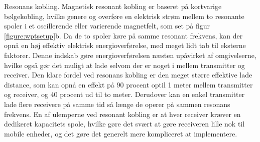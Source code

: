Resonans kobling. 
Magnetisk resonant kobling er baseret på kortvarige bølgekobling, hvilke genere og overføre en elektrisk strøm mellem to resonante spoler i et oscillerende eller varierende magnetfelt, som set på figur \ref{figure:wptsetup}b. Da de to spoler køre på samme resonant frekvens, kan der opnå en høj effektiv elektrisk energioverførelse, med meget lidt tab til  eksterne faktorer. Denne indskab gøre energioverførelsen næsten upåvirket af omgivelserne, hvilke også gør det muligt at lade selvom der er noget i mellem transmitter og receiver. 
Den klare fordel ved resonans kobling er den meget større effektive lade distance, som kan opnå en effekt på 90 procent optil 1 meter mellem transmitter og receiver, og 40 procent ud til to meter. Derudover kan en enkel transmitter lade flere receivere på samme tid så længe de operer på sammen resonans frekvens.
En af ulemperne ved resonant kobling er at hver receiver kræver en dedikeret kapacitets spole, hvilke gøre det svært at gøre receiveren lille nok til mobile enheder, og det gøre det generelt mere kompliceret at implementere. 